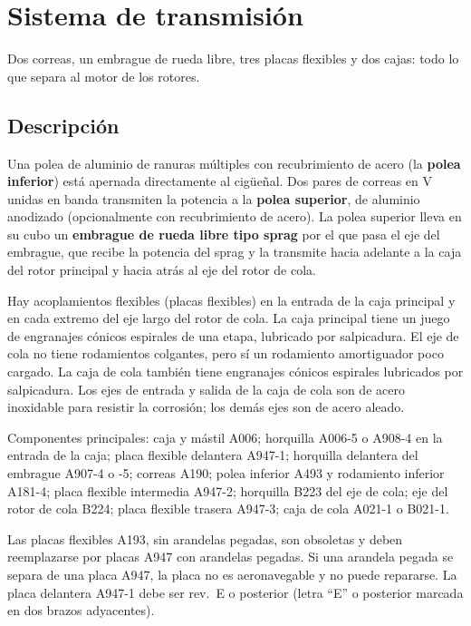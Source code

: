 \chapter{Sistema de transmisión}
\label{cap:mm-transmision}

\opening{Dos correas, un embrague de rueda libre, tres placas flexibles y dos cajas: todo lo que separa al motor de los rotores.}

\section{Descripción}

Una polea de aluminio de ranuras múltiples con recubrimiento de acero (la \textbf{polea inferior}) está apernada directamente al cigüeñal. Dos pares de correas en V unidas en banda transmiten la potencia a la \textbf{polea superior}, de aluminio anodizado (opcionalmente con recubrimiento de acero). La polea superior lleva en su cubo un \textbf{embrague de rueda libre tipo sprag} por el que pasa el eje del embrague, que recibe la potencia del sprag y la transmite hacia adelante a la caja del rotor principal y hacia atrás al eje del rotor de cola.

Hay acoplamientos flexibles (placas flexibles) en la entrada de la caja principal y en cada extremo del eje largo del rotor de cola. La caja principal tiene un juego de engranajes cónicos espirales de una etapa, lubricado por salpicadura. El eje de cola no tiene rodamientos colgantes, pero sí un rodamiento amortiguador poco cargado. La caja de cola también tiene engranajes cónicos espirales lubricados por salpicadura. Los ejes de entrada y salida de la caja de cola son de acero inoxidable para resistir la corrosión; los demás ejes son de acero aleado.

Componentes principales: caja y mástil A006; horquilla A006-5 o A908-4 en la entrada de la caja; placa flexible delantera A947-1; horquilla delantera del embrague A907-4 o -5; correas A190; polea inferior A493 y rodamiento inferior A181-4; placa flexible intermedia A947-2; horquilla B223 del eje de cola; eje del rotor de cola B224; placa flexible trasera A947-3; caja de cola A021-1 o B021-1.

\begin{advertencia}
Las placas flexibles A193, sin arandelas pegadas, son obsoletas y deben reemplazarse por placas A947 con arandelas pegadas. Si una arandela pegada se separa de una placa A947, la placa no es aeronavegable y no puede repararse. La placa delantera A947-1 debe ser rev.~E o posterior (letra ``E'' o posterior marcada en dos brazos adyacentes).
\end{advertencia}

